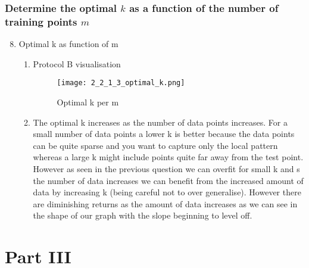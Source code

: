 \documentclass{article}
\begin{document}
    \subsubsection{Determine the optimal $k$ as a function of the number of training points $m$}
    \begin{enumerate}
        \setcounter{enumi}{7}
        \item Optimal k as function of m
        \begin{enumerate}[label=\alph*.]
            \item Protocol B visualisation
            \begin{figure}[H]
                \centering
                \texttt{[image: 2\_2\_1\_3\_optimal\_k.png]}
                \caption{\label{fig:2_2_1_3_optimal_k}Optimal k per m}
              \end{figure}
            \item
              The optimal k increases as the number of data points increases. For a small number of data points a lower k is better because the data points can be quite sparse and you want to capture only the local pattern whereas a large k might include points quite far away from the test point. However as seen in the previous question we can overfit for small k and s the number of data increases we can benefit from the increased amount of data by increasing k (being careful not to over generalise). However there are diminishing returns as the amount of data increases as we can see in the shape of our graph with the slope beginning to level off.
        \end{enumerate}
    \end{enumerate}


\section{Part III}
\end{document}
